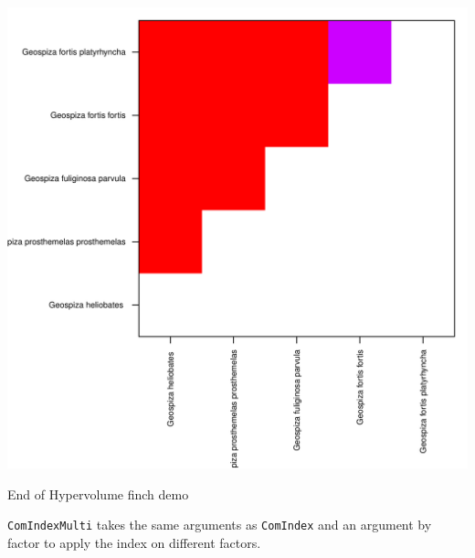 \documentclass[12pt]{article}\usepackage[]{graphicx}\usepackage[]{color}
\makeatletter
\def\maxwidth{ %
  \ifdim\Gin@nat@width>\linewidth
    \linewidth
  \else
    \Gin@nat@width
  \fi
}
\newenvironment{knitrout}{}{} %
\makeatother
\begin{document}
\begin{knitrout}
\includegraphics[width=\maxwidth]{figure/unnamed-chunk-572} 

\end{knitrout}
End of Hypervolume finch demo

\texttt{ComIndexMulti} takes the same arguments as \texttt{ComIndex} and an argument by factor to apply the index on different factors.
\end{document}
